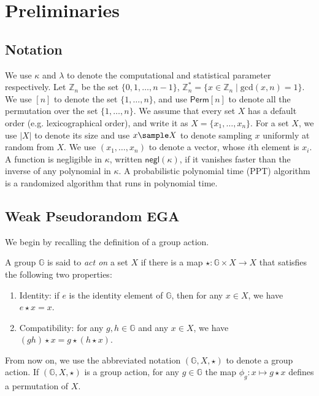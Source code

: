 \documentclass[a4paper,10pt]{article}
\begin{document}
\section{Preliminaries}\label{sec:preliminaries}

\subsection{Notation}
We use $\kappa$ and $\lambda$ to denote the computational and statistical parameter respectively. 
Let $\mathbb{Z}_n$ be the set $\{0,1, \dots, n-1\}$, $\mathbb{Z}_n^* = \{x \in \mathbb{Z}_n \mid \text{gcd}(x, n) = 1\}$. 
We use $[n]$ to denote the set $\{1, \dots, n\}$, 
and use $\mathsf{Perm}[n]$ to denote all the permutation over the set $\{1, \dots, n\}$. 
We assume that every set $X$ has a default order (e.g. lexicographical order), 
and write it as $X = \{x_1, \dots, x_n\}$.
For a set $X$, we use $|X|$ to denote its size and use $x \sample X$ to denote sampling $x$ uniformly at random from $X$.
We use $(x_1, \dots, x_n)$ to denote a vector, whose $i$th element is $x_i$.  
A function is negligible in $\kappa$, written $\mathsf{negl}(\kappa)$, 
if it vanishes faster than the inverse of any polynomial in $\kappa$.
A probabilistic polynomial time (PPT) algorithm is a randomized algorithm that runs in polynomial time. 

\subsection{Weak Pseudorandom EGA}\label{subsec:EGA}
We begin by recalling the definition of a group action. 
\begin{definition}
A group $\mathbb{G}$ is said to \emph{act on} a set $X$ if there is a map $\star: \mathbb{G} \times X \rightarrow X$ 
that satisfies the following two properties: 
\begin{enumerate}
    \item Identity: if $e$ is the identity element of $\mathbb{G}$, then for any $x \in X$, we have $e \star x = x$. 
    \item Compatibility: for any $g, h \in \mathbb{G}$ and any $x \in X$, 
        we have $(gh) \star x = g \star (h \star x)$. 
\end{enumerate}
\end{definition}

From now on, we use the abbreviated notation $(\mathbb{G}, X, \star)$ to denote a group action. 
If $(\mathbb{G}, X, \star)$ is a group action, for any $g \in \mathbb{G}$ the map $\phi_g: x \mapsto g \star x$ 
defines a permutation of $X$. 
\end{document}
